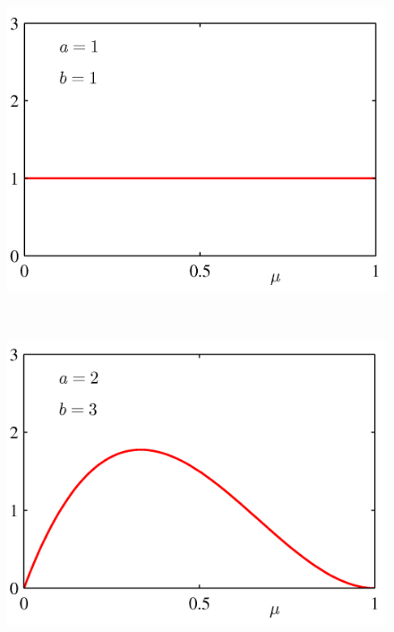 \documentclass[b5paper]{book}
\numberwithin{equation}{chapter}
\begin{document}
{\begin{figure}[ht]
\begin{minipage}[t]{0.5\linewidth}
		\label{fig:2-2a}
		\end{minipage}
		\begin{minipage}[t]{0.5\linewidth}
		\centering
		\includegraphics[scale=0.8]{Images/2-2b.png}
		\label{fig:2-2b}
		\end{minipage}\\
		\begin{minipage}[t]{0.5\linewidth}
		\centering
		\includegraphics[scale=0.8]{Images/2-2c.png}
		\label{fig:2-2c}
		\end{minipage}
		\begin{minipage}[t]{0.5\linewidth}
		\centering

\end{minipage}
\end{figure}}
\end{document}
